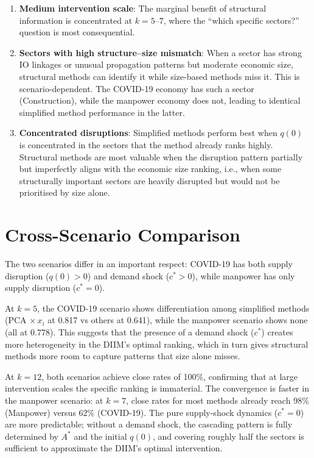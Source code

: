 \begin{enumerate}
    \item \textbf{Medium intervention scale}: The marginal benefit of structural information is concentrated at $k = 5$--$7$, where the ``which specific sectors?'' question is most consequential.

    \item \textbf{Sectors with high structure--size mismatch}: When a sector has strong IO linkages or unusual propagation patterns but moderate economic size, structural methods can identify it while size-based methods miss it. This is scenario-dependent. The COVID-19 economy has such a sector (Construction), while the manpower economy does not, leading to identical simplified method performance in the latter.

    \item \textbf{Concentrated disruptions}: Simplified methods perform best when $q(0)$ is concentrated in the sectors that the method already ranks highly. Structural methods are most valuable when the disruption pattern partially but imperfectly aligns with the economic size ranking, i.e., when some structurally important sectors are heavily disrupted but would not be prioritised by size alone.
\end{enumerate}


\section{Cross-Scenario Comparison}

The two scenarios differ in an important respect: COVID-19 has both supply disruption ($q(0) > 0$) and demand shock ($c^{*} > 0$), while manpower has only supply disruption ($c^{*} = 0$).

At $k = 5$, the COVID-19 scenario shows differentiation among simplified methods (PCA $\times\, x_i$ at 0.817 vs others at 0.641), while the manpower scenario shows none (all at 0.778). This suggests that the presence of a demand shock ($c^*$) creates more heterogeneity in the DIIM's optimal ranking, which in turn gives structural methods more room to capture patterns that size alone misses.

At $k = 12$, both scenarios achieve close rates of 100\%, confirming that at large intervention scales the specific ranking is immaterial. The convergence is faster in the manpower scenario: at $k = 7$, close rates for most methods already reach 98\% (Manpower) versus 62\% (COVID-19). The pure supply-shock dynamics ($c^{*} = 0$) are more predictable; without a demand shock, the cascading pattern is fully determined by $A^{*}$ and the initial $q(0)$, and covering roughly half the sectors is sufficient to approximate the DIIM's optimal intervention.


